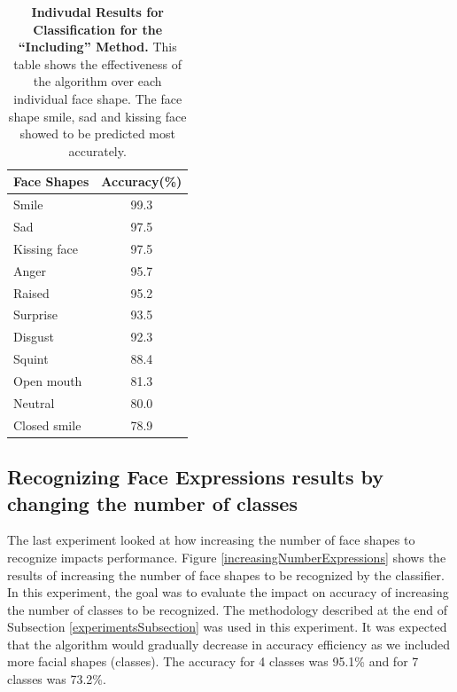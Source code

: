 \documentclass[]{article}
\begin{document}
\begin{table}[t]
\centering
\begin{tabular}{|l|c|}
\hline
Face Shapes & Accuracy(\%) \\ \hline
Smile & 99.3\\\hline
Sad & 97.5\\\hline
Kissing face & 97.5\\\hline
Anger & 95.7\\\hline
Raised & 95.2\\\hline
Surprise & 93.5\\\hline
Disgust & 92.3\\\hline
Squint & 88.4\\\hline
Open mouth & 81.3\\\hline
Neutral & 80.0\\\hline
Closed smile & 78.9\\\hline
\end{tabular}
\caption{\textbf{Indivudal Results for Classification for the ``Including''
Method.} This table shows the effectiveness of the algorithm over each individual face
shape. The face shape smile, sad and kissing face showed to be predicted most accurately.}
\label{rankIn}
\end{table}

 
\subsection{Recognizing Face Expressions results by changing the number of classes}
The last experiment looked at how increasing the number of face shapes to recognize impacts performance. Figure
\ref{increasingNumberExpressions} shows the results of increasing the number of face shapes to be recognized by the
classifier. In this experiment, the goal was to evaluate the impact on accuracy of increasing  the number of classes to
be recognized. The methodology described at the end of Subsection \ref{experimentsSubsection} was used in this
experiment. It was expected that the algorithm would gradually decrease in accuracy efficiency as we included more
facial shapes (classes). The accuracy for 4 classes was 95.1\% and for 7 classes was 73.2\%.
\end{document}

